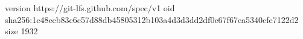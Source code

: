 version https://git-lfs.github.com/spec/v1
oid sha256:1c48ecb83c6c57d88db45805312b103a4d3d3dd2df0e67f67ea5340cfe7122d2
size 1932
